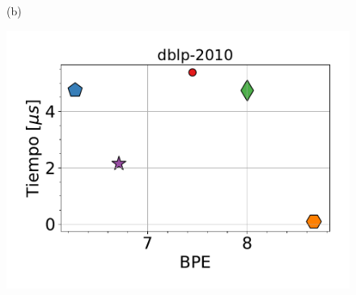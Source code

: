 \begin{figure}
\begin{minipage}{1\textwidth}
\begin{minipage}{0.45\textwidth}
    			(b)
    		\end{minipage}  		
    	\end{minipage}
    	
    	\begin{minipage}{1\textwidth}
    		\centering
    		\begin{minipage}{0.45\textwidth}
    			\centering
    			\begin{minipage}{0.75\textwidth}
    				\centering
    				\includegraphics[width=1\linewidth]{img/bpeTimes/aleatorio/dblp-2010.pdf}
    			\end{minipage}
    			\begin{minipage}{0.2\textwidth}
    				\centering

\end{minipage}
\end{minipage}
\end{minipage}
\end{figure}
